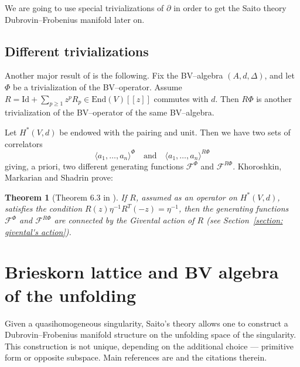 \documentclass[12pt,a4paper]{amsart}
\newcommand{\F}[2]{{F_{#1}^{#2}}}
\def\F{{\mathcal F}}
\newcommand{\p}{{\partial}}
\newcommand{\<}{\left<}
\renewcommand{\>}{\right>}
\newcommand{\Id}{\mathrm{Id}}
\newcommand{\End}{{\mathrm{End}}}
\newtheorem{theorem}{Theorem}[section]
\numberwithin{equation}{section}
\begin{document}
We are going to use special trivializations of $\p$ in order to get the Saito theory Dubrovin--Frobenius manifold later on.

\subsection{Different trivializations}\label{section: different trivializations}
Another major result of \cite{KMS} is the following. Fix the BV--algebra $(A,d,\Delta)$, and let $\Phi$ be a trivialization of the BV--operator. Assume $R = \Id + \sum_{p \ge 1} z^p R_p \in \End(V)[[z]]$ commutes with $d$. Then $R\Phi$ is another trivialization of the BV--operator of the same BV--algebra.

Let $H^\ast(V,d)$ be endowed with the pairing and unit. Then we have two sets of correlators
\[
 \langle a_1,\dots,a_n \rangle^{\Phi} \quad \text{and} \quad \langle a_1,\dots,a_n \rangle^{R\Phi}
\]
giving, a priori, two different generating functions $\F^{\Phi}$ and $\F^{R\Phi}$. Khoroshkin, Markarian and Shadrin prove:

\begin{theorem}[Theorem 6.3 in \cite{KMS}]\label{theorem: KMS different trivializations}
    If $R$, assumed as an operator on $H^\ast(V,d)$, satisfies the condition $R(z)\eta^{-1}R^T(-z) = \eta^{-1}$, then the generating functions $\F^{\Phi}$ and $\F^{R\Phi}$ are connected by the Givental action of $R$ (see Section~\ref{section: givental's action}).
\end{theorem}


\section{Brieskorn lattice and BV algebra of the unfolding}\label{section: unfolding}
Given a quasihomogeneous singularity, Saito's theory allows one to construct a Dubrovin--Frobenius manifold structure on the unfolding space of the singularity. This construction is not unique, depending on the additional choice --- primitive form or opposite subspace. Main references are \cite{ST, H} and the citations therein.
\end{document}
